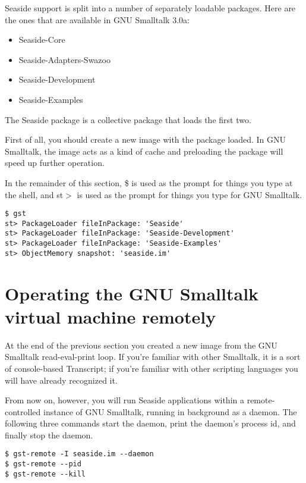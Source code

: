 \documentclass[a4paper,10pt,twoside]{book}
\newcommand{\ct}[1]{{\small\ttfamily\textup{#1}}}
\begin{document}
Seaside support is split into a number of separately loadable packages. Here are the ones that are available in GNU Smalltalk 3.0a:

\begin{itemize}
\item  Seaside-Core
\item  Seaside-Adapters-Swazoo
\item  Seaside-Development
\item  Seaside-Examples
\end{itemize}

The Seaside package is a collective package that loads the first two.

First of all, you should create a new image with the package loaded. In GNU Smalltalk, the image acts as a kind of cache and preloading the package will speed up further operation. 

In the remainder of this section, \ct{\$} is used as the prompt for things you type at the shell, and \ct{st$>$} is used as the prompt for things you type for GNU Smalltalk.

\begin{lstlisting}
$ gst
st> PackageLoader fileInPackage: 'Seaside'
st> PackageLoader fileInPackage: 'Seaside-Development'
st> PackageLoader fileInPackage: 'Seaside-Examples'
st> ObjectMemory snapshot: 'seaside.im'
\end{lstlisting}

\section{Operating the GNU Smalltalk virtual machine remotely}
\label{book:gettingstarted:gst:remotevm}

At the end of the previous section you created a new image from the GNU Smalltalk read-eval-print loop. If you're familiar with other Smalltalk, it is a sort of console-based Transcript; if you're familiar with other scripting languages you will have already recognized it.

From now on, however, you will run Seaside applications within a remote-controlled instance of GNU Smalltalk, running in background as a daemon. The following three commands start the daemon, print the daemon's process id, and finally stop the daemon.

\begin{lstlisting}
$ gst-remote -I seaside.im --daemon
$ gst-remote --pid
$ gst-remote --kill
\end{lstlisting}
\end{document}
